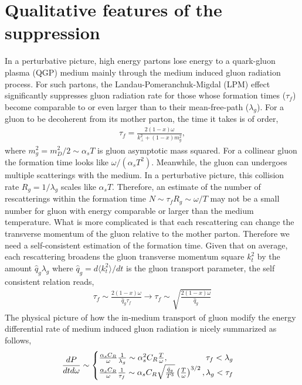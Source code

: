 \documentclass[aps, prc, reprint, amsmath, groupedaddress, nofootinbib]{revtex4-1}
\begin{document}
\section{Qualitative features of the suppression}
In a perturbative picture, high energy partons lose energy to a quark-gluon plasma (QGP) medium mainly through the medium induced gluon radiation process.
For such partons, the Landau-Pomeranchuk-Migdal (LPM) effect significantly suppresses gluon radiation rate for those whose formation times ($\tau_f$) become comparable to or even larger than to their mean-free-path ($\lambda_g$).
For a gluon to be decoherent from its mother parton, the time it takes is of order,
\begin{eqnarray}\label{eq:tau_1}
\tau_f = \frac{2(1-x)\omega}{k_\perp^2+(1-x)m_g^2},
\end{eqnarray}
where $m_g^2=m_D^2/2 \sim \alpha_s T$ is gluon asymptotic mass squared.
For a collinear gluon the formation time looks like $\omega/(\alpha_s T^2)$.
Meanwhile, the gluon can undergoes multiple scatterings with the medium.
In a perturbative picture, this collision rate $R_{g} = 1/\lambda_g$ scales like $\alpha_s T$. 
Therefore, an estimate of the number of rescatterings within the formation time $N \sim \tau_f R_g \sim \omega/T$ may not be a small number for gluon with energy comparable or larger than the medium temperature.
What is more complicated is that each rescattering can change the transverse momentum of the gluon relative to the mother parton.
Therefore we need a self-consistent estimation of the formation time.
Given that on average, each rescattering broadens the gluon transverse momentum square $k_t^2$ by the amount $\hat{q}_g\lambda_g$ where $\hat{q}_g = d\langle k_t^2\rangle/dt$ is the gluon transport parameter, the self consistent relation reads,
\begin{eqnarray}\label{eq:tau_n}
\tau_f \sim \frac{2(1-x)\omega}{\hat{q}_g\tau_f} \longrightarrow \tau_f \sim \sqrt{\frac{2(1-x)\omega}{\hat{q}_g}}
\end{eqnarray}
The physical picture of how the in-medium transport of gluon modify the energy differential rate of medium induced gluon radiation is nicely summarized as follows,
\begin{eqnarray}\label{eq:LPM}
\frac{dP}{dt d\omega} \sim \begin{cases}
 \frac{\alpha_s C_R}{\omega} \frac{1}{\lambda_g} \sim \alpha_s^2 C_R \frac{T}{\omega}, \hfill \tau_f < \lambda_g\\
 \frac{\alpha_s C_R}{\omega} \frac{1}{\tau_f}\sim \alpha_s C_R \sqrt{\frac{\hat{q}_g}{T^3}} \left(\frac{T}{\omega}\right)^{3/2}, \hfill \lambda_g < \tau_f
\end{cases}
\end{eqnarray}
\end{document}
